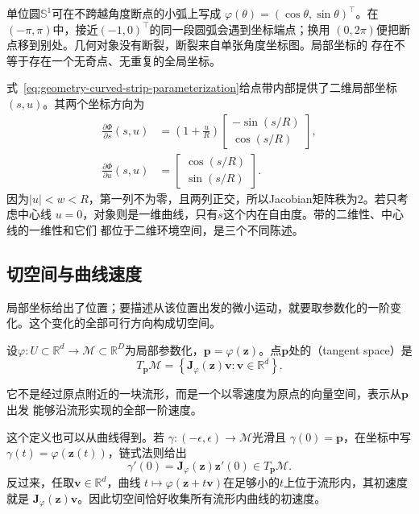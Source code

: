 单位圆$\mathbb{S}^1$可在不跨越角度断点的小弧上写成
$\varphi(\theta)=(\cos\theta,\sin\theta)^{\top}$。在
$(-\pi,\pi)$中，接近$(-1,0)^{\top}$的同一段圆弧会遇到坐标端点；换用
$(0,2\pi)$便把断点移到别处。几何对象没有断裂，断裂来自单张角度坐标图。局部坐标的
存在不等于存在一个无奇点、无重复的全局坐标。

式~\eqref{eq:geometry-curved-strip-parameterization}给点带内部提供了二维局部坐标
$(s,u)$。其两个坐标方向为
\begin{align}
  \frac{\partial\Phi}{\partial s}(s,u)
  &=
  \left(1+\frac{u}{R}\right)
  \begin{bmatrix}
    -\sin(s/R)\\
    \cos(s/R)
  \end{bmatrix},
  \label{eq:geometry-strip-s-tangent}\\
  \frac{\partial\Phi}{\partial u}(s,u)
  &=
  \begin{bmatrix}
    \cos(s/R)\\
    \sin(s/R)
  \end{bmatrix}.
  \label{eq:geometry-strip-u-tangent}
\end{align}
因为$|u|<w<R$，第一列不为零，且两列正交，所以Jacobian矩阵秩为$2$。若只考虑中心线
$u=0$，对象则是一维曲线，只有$s$这个内在自由度。带的二维性、中心线的一维性和它们
都位于二维环境空间，是三个不同陈述。

\subsection{切空间与曲线速度}

局部坐标给出了位置；要描述从该位置出发的微小运动，就要取参数化的一阶变化。这个变化的全部可行方向构成切空间。

\begin{definition}[嵌入流形的切空间]
\label{def:geometry-tangent-space}
设$\varphi:U\subset\mathbb R^d\to\mathcal M\subset\mathbb R^D$为局部参数化，$\bm p=\varphi(\bm z)$。点$\bm p$处的（tangent space）是
\begin{equation}
  T_{\bm{p}}\mathcal{M}
  =
  \left\{
    \bm{J}_{\varphi}(\bm{z})\bm{v}
    :
    \bm{v}\in\mathbb{R}^d
  \right\}.
  \label{eq:geometry-tangent-space-chart}
\end{equation}
\end{definition}
它不是经过原点附近的一块流形，而是一个以零速度为原点的向量空间，表示从$\bm{p}$出发
能够沿流形实现的全部一阶速度。

这个定义也可以从曲线得到。若
$\gamma:(-\epsilon,\epsilon)\to\mathcal{M}$光滑且
$\gamma(0)=\bm{p}$，在坐标中写
$\gamma(t)=\varphi(\bm{z}(t))$，链式法则给出
\[
  \gamma'(0)
  =
  \bm{J}_{\varphi}(\bm{z})\bm{z}'(0)
  \in T_{\bm{p}}\mathcal{M}.
\]
反过来，任取$\bm{v}\in\mathbb{R}^d$，曲线
$t\mapsto\varphi(\bm{z}+t\bm{v})$在足够小的$t$上位于流形内，其初速度就是
$\bm{J}_{\varphi}(\bm{z})\bm{v}$。因此切空间恰好收集所有流形内曲线的初速度。


